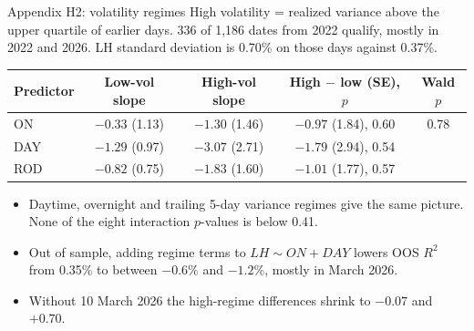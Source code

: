 \documentclass[aspectratio=169,10pt]{beamer}
\begin{document}
\begin{frame}{Appendix H2: volatility regimes}
  \small
  High volatility = realized variance above the upper quartile of earlier days. 336 of 1,186 dates from 2022 qualify, mostly in 2022 and 2026. LH standard deviation is 0.70\% on those days against 0.37\%.
  \begin{center}
  \begin{tabular}{lcccc}
    \hline
    Predictor & Low-vol slope & High-vol slope & High $-$ low (SE), $p$ & Wald $p$\\
    \hline
    ON & $-0.33$ (1.13) & $-1.30$ (1.46) & $-0.97$ (1.84), 0.60 & 0.78\\
    DAY & $-1.29$ (0.97) & $-3.07$ (2.71) & $-1.79$ (2.94), 0.54 & \\
    ROD & $-0.82$ (0.75) & $-1.83$ (1.60) & $-1.01$ (1.77), 0.57 & \\
    \hline
  \end{tabular}
  \end{center}
  \begin{itemize}
    \item Daytime, overnight and trailing 5-day variance regimes give the same picture. None of the eight interaction $p$-values is below 0.41.
    \item Out of sample, adding regime terms to $LH\sim ON+DAY$ lowers OOS $R^2$ from 0.35\% to between $-0.6\%$ and $-1.2\%$, mostly in March 2026.
    \item Without 10 March 2026 the high-regime differences shrink to $-0.07$ and $+0.70$.
  \end{itemize}
\end{frame}
\end{document}
